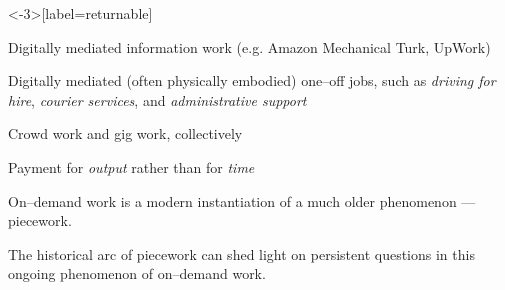 \documentclass[presentation]{subfiles}
\begin{document}
\begin{frame}<-3>[label=returnable]{}
      \begin{description}
        \item<1-> [Crowd work] Digitally mediated \alert{information work}
        (e.g. Amazon Mechanical Turk, UpWork)\\
          \scriptsize{\textcite{crowdworkFuture}}\normalsize{}
        \item<2-> [Gig work] Digitally mediated (often \alert{physically embodied}) one--off jobs,
        such as
        \emph{driving for hire},
        \emph{courier services},
        and \emph{administrative support}\\
          \scriptsize{\textcite{friedman2014workers,Parigi:2016:GE:3026779.3013496}}\normalsize{}
        \item<3-> [On--demand~work] Crowd work and gig work, collectively
        \item<5-> [Piecework] Payment for \emph{output} rather than for \emph{time}
      \end{description}
\end{frame}


\begin{frame}[standout]
On--demand work is a modern instantiation of a much older phenomenon
--- \alert{piecework}.

{\normalsize The historical arc of piecework
can shed light on persistent questions
in this ongoing phenomenon of on--demand work.}
\end{frame}

\end{document}
